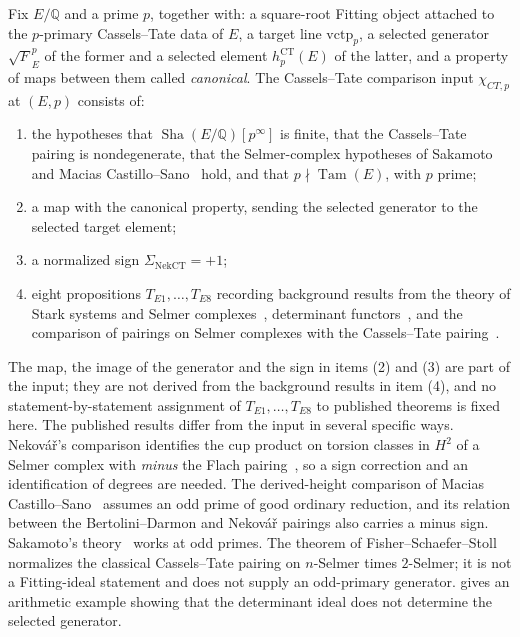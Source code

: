 \documentclass[11pt]{article}
\theoremstyle{definition}
\newcommand{\Q}{\mathbb{Q}}
\newcommand{\Sha}{\operatorname{Sha}}
\newcommand{\Tam}{\operatorname{Tam}}
\newcommand{\chiCTp}{\chi_{CT,p}}                       \newcommand{\AofE}{\mathcal{A}_E}                        \newcommand{\etap}{\eta_p}                              \newcommand{\RefStable}{\mathbf{RefStable\,AOR}}
\begin{document}
\begin{definition}\label{def:closure:chi-ct-p-import}
Fix $E/\Q$ and a prime $p$, together with: a square-root Fitting object
attached to the $p$-primary Cassels--Tate data of $E$, a target line
$\mathrm{vctp}_p$, a selected generator $\sqrt{F}_E^p$ of the former and a
selected element $h_p^{\mathrm{CT}}(E)$ of the latter, and a property of
maps between them called \emph{canonical}.  The Cassels--Tate comparison
input $\chiCTp$ at $(E,p)$ consists of:
\begin{enumerate}
\item the hypotheses that $\Sha(E/\Q)[p^\infty]$ is finite, that the
  Cassels--Tate pairing is nondegenerate, that the Selmer-complex
  hypotheses of Sakamoto~\citep{Sakamoto2018} and Macias
  Castillo--Sano~\citep{MaciasCastilloSano2026} hold, and that
  $p\nmid\Tam(E)$, with $p$ prime;
\item a map with the canonical property, sending the selected generator
  to the selected target element;
\item a normalized sign $\Sigma_{\mathrm{NekCT}}=+1$;
\item eight propositions $T_{E1},\dots,T_{E8}$ recording background
  results from the theory of Stark systems and Selmer
  complexes~\citep{Sakamoto2018,MaciasCastilloSano2026}, determinant
  functors~\citep{KnudsenMumford1976}, and the comparison of pairings on
  Selmer complexes with the Cassels--Tate
  pairing~\citep{Nekovar2006,Flach1990,FisherSchaeferStoll2010}.
\end{enumerate}
\end{definition}

The map, the image of the generator and the sign in items (2) and (3) are
part of the input; they are not derived from the background results in
item (4), and no statement-by-statement assignment of $T_{E1},\dots,T_{E8}$
to published theorems is fixed here.  The published results differ from
the input in several specific ways.  Nekov\'a\v{r}'s comparison
\citep[Proposition~10.8.7]{Nekovar2006} identifies the cup product on
torsion classes in $H^2$ of a Selmer complex with \emph{minus} the Flach
pairing~\citep{Flach1990}, so a sign correction and an identification of
degrees are needed.  The derived-height comparison of Macias
Castillo--Sano~\citep[Theorem~4.2]{MaciasCastilloSano2026} assumes an odd
prime of good ordinary reduction, and its relation between the
Bertolini--Darmon and Nekov\'a\v{r} pairings also carries a minus sign.
Sakamoto's theory~\citep{Sakamoto2018} works at odd primes.  The theorem of
Fisher--Schaefer--Stoll~\citep[Theorem~6.3]{FisherSchaeferStoll2010}
normalizes the classical Cassels--Tate pairing on $n$-Selmer times
$2$-Selmer; it is not a Fitting-ideal statement and does not supply an
odd-primary generator.   gives an arithmetic example
showing that the determinant ideal does not determine the selected
generator.
\end{document}
